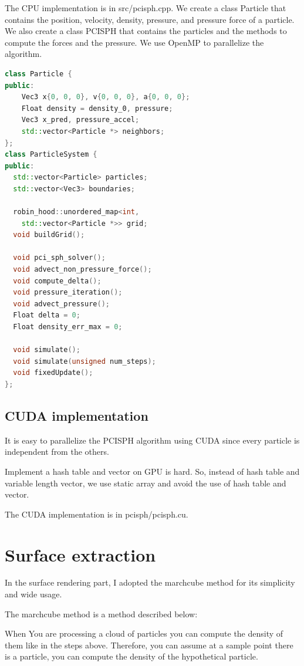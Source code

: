 \documentclass[acmtog]{acmart}
\begin{document}
The CPU implementation is in src/pcisph.cpp. We create a class Particle that contains the position, velocity, density, pressure, and pressure force of a particle.
We also create a class PCISPH that contains the particles and the methods to compute the forces and the pressure.
We use OpenMP to parallelize the algorithm.

\begin{lstlisting}[language=C++,basicstyle=\ttfamily\small]
class Particle {
public:
	Vec3 x{0, 0, 0}, v{0, 0, 0}, a{0, 0, 0};
	Float density = density_0, pressure;
	Vec3 x_pred, pressure_accel;
	std::vector<Particle *> neighbors;
};
class ParticleSystem {
public:
  std::vector<Particle> particles;
  std::vector<Vec3> boundaries;

  robin_hood::unordered_map<int,
    std::vector<Particle *>> grid;
  void buildGrid();

  void pci_sph_solver();
  void advect_non_pressure_force();
  void compute_delta();
  void pressure_iteration();
  void advect_pressure();
  Float delta = 0;
  Float density_err_max = 0;

  void simulate();
  void simulate(unsigned num_steps);
  void fixedUpdate();
};
\end{lstlisting}

\subsection{CUDA implementation}

It is easy to parallelize the PCISPH algorithm using CUDA since every particle is independent from the others.

Implement a hash table and vector on GPU is hard.
So, instead of hash table and variable length vector, we use static array and avoid the use of hash table and vector.

The CUDA implementation is in pcisph/pcisph.cu.

\section{Surface extraction}

In the surface rendering part, I adopted the marchcube method for its simplicity and wide usage.

The marchcube method is a method described below:

When You are processing a cloud of particles you can compute the density of them like in the steps above. Therefore,
you can assume at a sample point there is a particle, you can compute the density of the hypothetical particle.
\end{document}

